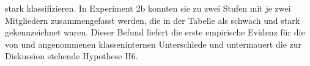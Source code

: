 stark klassifizieren. In Experiment 2b konnten sie zu zwei Stufen mit je zwei Mitgliedern zusammengefasst werden, die in der Tabelle als schwach und stark gekennzeichnet waren. Dieser Befund liefert die erste empirische Evidenz für die von \citet[87]{Biedermann.1969} und {\citet[408]{Breindl.2007}} angenommenen klasseninternen Unterschiede und untermauert die zur Diskussion stehende {Hypothese H6}.










